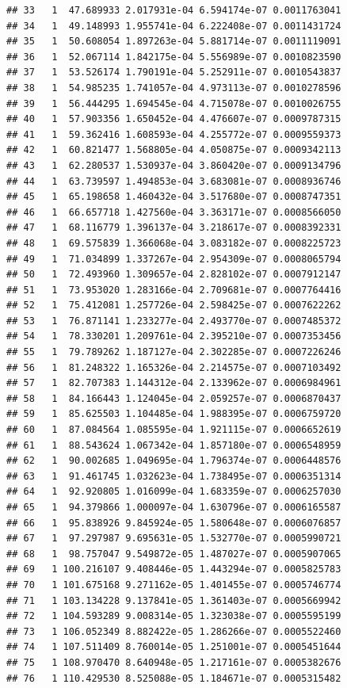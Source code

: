 \documentclass[article]{jss}\usepackage[]{graphicx}\usepackage[]{xcolor}
\makeatletter
\newenvironment{kframe}{%
 \def\at@end@of@kframe{}%
 \ifinner\ifhmode%
  \def\at@end@of@kframe{\end{minipage}}%
  \begin{minipage}{\columnwidth}%
 \fi\fi%
 \def\FrameCommand##1{\hskip\@totalleftmargin \hskip-\fboxsep
 \colorbox{shadecolor}{##1}\hskip-\fboxsep
     \hskip-\linewidth \hskip-\@totalleftmargin \hskip\columnwidth}%
 \MakeFramed {\advance\hsize-\width
   \@totalleftmargin\z@ \linewidth\hsize
   \@setminipage}}%
 {\par\unskip\endMakeFramed%
 \at@end@of@kframe}
\newenvironment{knitrout}{}{} %
\makeatother
\begin{document}
\begin{knitrout}
\begin{kframe}
\begin{verbatim}
## 33   1  47.689933 2.017931e-04 6.594174e-07 0.0011763041
## 34   1  49.148993 1.955741e-04 6.222408e-07 0.0011431724
## 35   1  50.608054 1.897263e-04 5.881714e-07 0.0011119091
## 36   1  52.067114 1.842175e-04 5.556989e-07 0.0010823590
## 37   1  53.526174 1.790191e-04 5.252911e-07 0.0010543837
## 38   1  54.985235 1.741057e-04 4.973113e-07 0.0010278596
## 39   1  56.444295 1.694545e-04 4.715078e-07 0.0010026755
## 40   1  57.903356 1.650452e-04 4.476607e-07 0.0009787315
## 41   1  59.362416 1.608593e-04 4.255772e-07 0.0009559373
## 42   1  60.821477 1.568805e-04 4.050875e-07 0.0009342113
## 43   1  62.280537 1.530937e-04 3.860420e-07 0.0009134796
## 44   1  63.739597 1.494853e-04 3.683081e-07 0.0008936746
## 45   1  65.198658 1.460432e-04 3.517680e-07 0.0008747351
## 46   1  66.657718 1.427560e-04 3.363171e-07 0.0008566050
## 47   1  68.116779 1.396137e-04 3.218617e-07 0.0008392331
## 48   1  69.575839 1.366068e-04 3.083182e-07 0.0008225723
## 49   1  71.034899 1.337267e-04 2.954309e-07 0.0008065794
## 50   1  72.493960 1.309657e-04 2.828102e-07 0.0007912147
## 51   1  73.953020 1.283166e-04 2.709681e-07 0.0007764416
## 52   1  75.412081 1.257726e-04 2.598425e-07 0.0007622262
## 53   1  76.871141 1.233277e-04 2.493770e-07 0.0007485372
## 54   1  78.330201 1.209761e-04 2.395210e-07 0.0007353456
## 55   1  79.789262 1.187127e-04 2.302285e-07 0.0007226246
## 56   1  81.248322 1.165326e-04 2.214575e-07 0.0007103492
## 57   1  82.707383 1.144312e-04 2.133962e-07 0.0006984961
## 58   1  84.166443 1.124045e-04 2.059257e-07 0.0006870437
## 59   1  85.625503 1.104485e-04 1.988395e-07 0.0006759720
## 60   1  87.084564 1.085595e-04 1.921115e-07 0.0006652619
## 61   1  88.543624 1.067342e-04 1.857180e-07 0.0006548959
## 62   1  90.002685 1.049695e-04 1.796374e-07 0.0006448576
## 63   1  91.461745 1.032623e-04 1.738495e-07 0.0006351314
## 64   1  92.920805 1.016099e-04 1.683359e-07 0.0006257030
## 65   1  94.379866 1.000097e-04 1.630796e-07 0.0006165587
## 66   1  95.838926 9.845924e-05 1.580648e-07 0.0006076857
## 67   1  97.297987 9.695631e-05 1.532770e-07 0.0005990721
## 68   1  98.757047 9.549872e-05 1.487027e-07 0.0005907065
## 69   1 100.216107 9.408446e-05 1.443294e-07 0.0005825783
## 70   1 101.675168 9.271162e-05 1.401455e-07 0.0005746774
## 71   1 103.134228 9.137841e-05 1.361403e-07 0.0005669942
## 72   1 104.593289 9.008314e-05 1.323038e-07 0.0005595199
## 73   1 106.052349 8.882422e-05 1.286266e-07 0.0005522460
## 74   1 107.511409 8.760014e-05 1.251001e-07 0.0005451644
## 75   1 108.970470 8.640948e-05 1.217161e-07 0.0005382676
## 76   1 110.429530 8.525088e-05 1.184671e-07 0.0005315482

\end{verbatim}
\end{kframe}
\end{knitrout}
\end{document}
